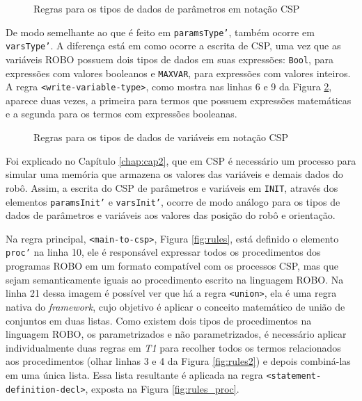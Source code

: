 \begin{figure}[h]
\centering
\caption{Regras para os tipos de dados de parâmetros em notação CSP}

\label{fig:rules_param_type}
\end{figure}

De modo semelhante ao que é feito em \texttt{paramsType'}, também ocorre em \texttt{varsType'}. A diferença está em como ocorre a escrita de CSP, uma vez que as variáveis ROBO possuem dois tipos de dados em suas expressões: \texttt{Bool}, para expressões com valores booleanos e \texttt{MAXVAR}, para expressões com valores inteiros. A regra \texttt{<write-variable-type>}, como mostra nas linhas 6 e 9 da Figura \ref{fig:rules_var_type}, aparece duas vezes, a primeira para termos que possuem expressões matemáticas e a segunda para os termos com expressões booleanas.

\begin{figure}[h]
\centering
\caption{Regras para os tipos de dados de variáveis em notação CSP}

\label{fig:rules_var_type}
\end{figure}

Foi explicado no Capítulo \ref{chap:cap2}, que em CSP é necessário um processo para simular uma memória que armazena os valores das variáveis e demais dados do robô. Assim, a escrita do CSP de parâmetros e variáveis em \texttt{INIT}, através dos elementos \texttt{paramsInit'} e \texttt{varsInit'}, ocorre de modo análogo para os tipos de dados de parâmetros e variáveis aos valores das posição do robô e orientação.

Na regra principal, \texttt{<main-to-csp>}, Figura \ref{fig:rules}, está definido o elemento \texttt{proc'} na linha 10, ele é responsável expressar todos os procedimentos dos programas ROBO em um formato compatível com os processos CSP, mas que sejam semanticamente iguais ao procedimento escrito na linguagem ROBO. Na linha 21 dessa imagem é possível ver que há a regra \texttt{<union>}, ela é uma regra nativa do \textit{framework}, cujo objetivo é aplicar o conceito matemático de união de conjuntos em duas listas. Como existem dois tipos de procedimentos na linguagem ROBO, os parametrizados e não parametrizados, é necessário aplicar individualmente duas regras em \textit{T1} para recolher todos os termos relacionados aos procedimentos (olhar linhas 3 e 4 da Figura \ref{fig:rules2}) e depois combiná-las em uma única lista. Essa lista resultante é aplicada na regra \texttt{<statement-definition-decl>}, exposta na Figura \ref{fig:rules_proc}.


